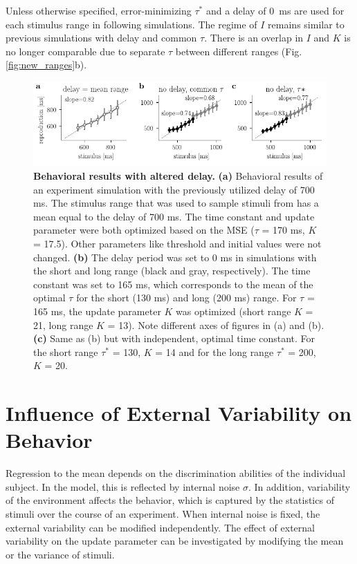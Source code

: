 \documentclass[10pt]{article}
\begin{document}
Unless otherwise specified, error-minimizing $\tau^*$ and a delay of 0~ms are used for each stimulus range in following simulations. The regime of $I$ remains similar to previous simulations with delay and common $\tau$. There is an overlap in $I$ and $K$ is no longer comparable due to separate $\tau$ between different ranges (Fig. \ref{fig:new_ranges}b).

\begin{figure}[ht]
	\centering
	\includegraphics{figures/delay.pdf}
	\caption{\textbf{Behavioral results with altered delay.} 
	\textbf{(a)} Behavioral results of an experiment simulation with the previously utilized delay of 700 ms. The stimulus range that was used to sample stimuli from has a mean equal to the delay of 700 ms. The time constant and update parameter were both optimized based on the MSE ($\tau$ = 170 ms, $K$ = 17.5). Other parameters like threshold and initial values were not changed. 
	\textbf{(b)} The delay period was set to 0 ms in simulations with the short and long range (black and gray, respectively). The time constant was set to 165 ms, which corresponds to the mean of the optimal $\tau$ for the short (130 ms) and long (200 ms) range. For $\tau$ = 165 ms, the update parameter $K$ was optimized (short range $K$ = 21, long range $K$ = 13). Note different axes of figures in (a) and (b).
	\textbf{(c)} Same as (b) but with independent, optimal time constant. For the short range $\tau^*$ = 130, $K$ = 14 and for the long range $\tau^*$ = 200, $K$ = 20.
	}
\label{fig:delay}
\end{figure}


\section{Influence of External Variability on Behavior} \label{externalvar}
Regression to the mean depends on the discrimination abilities of the individual subject. In the model, this is reflected by internal noise $\sigma$.
In addition, variability of the environment affects the behavior, which is captured by the statistics of stimuli over the course of an experiment. 
When internal noise is fixed, the external variability can be modified independently. 
The effect of external variability on the update parameter can be investigated by modifying the mean or the variance of stimuli. 
\end{document}
